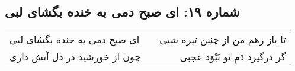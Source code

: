 \begin{center}
\section*{شماره ۱۹: ای صبح دمی به خنده بگشای لبی}
\label{sec:019}
\begin{longtable}{l p{0.5cm} r}
ای صبح دمی به خنده بگشای لبی
&&
تا باز رهم من از چنین تیره شبی
\\
چون از خورشید در دل آتش داری
&&
گر درگیرد دَمِ تو نَبْوَد عجبی
\\
\end{longtable}
\end{center}
